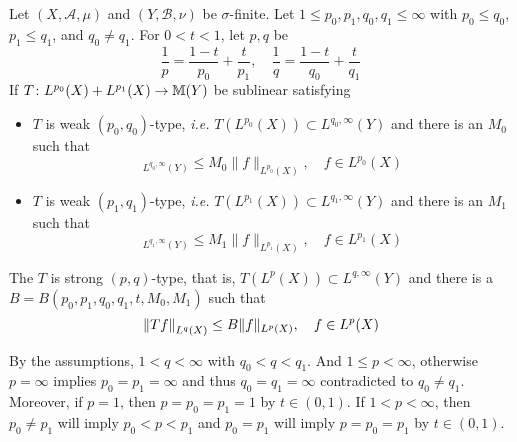 \begin{thm}
	Let $(X, \mathscr{A}, \mu)$ and $(Y, \mathscr{B}, \nu)$ be $\sigma$-finite. Let $1 \leq p_0,p_1,q_0,q_1 \leq \infty$ with $p_0 \leq q_0$, $p_1 \leq q_1$, and $q_0 \neq q_1$. For $0 < t < 1$, let $p,q$ be
	\begin{equation*}
		\frac{1}{p}=\frac{1-t}{p_0}+\frac{t}{p_1}, \quad \frac{1}{q}=\frac{1-t}{q_0}+\frac{t}{q_1}
	\end{equation*}
	If $T \colon L^{p_0}(X)+L^{p_1}(X) \rightarrow \mathbb{M}(Y)$ be sublinear satisfying
	\begin{itemize}
		\item $T$ is weak $(p_0,q_0)$-type, \emph{i.e.} $T(L^{p_0}(X)) \subset L^{q_0,\infty}(Y)$ and there is an $M_0$ such that
		\begin{equation*}
			[T f]_{L^{q_0, \infty}(Y)} \leq M_0\|f\|_{L^{p_0}(X)},\quad f \in L^{p_0}(X)
		\end{equation*}
		\item $T$ is weak $(p_1,q_1)$-type, \emph{i.e.} $T(L^{p_1}(X)) \subset L^{q_1,\infty}(Y)$ and there is an $M_1$ such that
		\begin{equation*}
			[T f]_{L^{q_1, \infty}(Y)} \leq M_1\|f\|_{L^{p_1}(X)},\quad f \in L^{p_1}(X)
		\end{equation*}
	\end{itemize}
	The $T$ is strong $(p,q)$-type, that is, $T(L^p(X)) \subset L^{q,\infty}(Y)$ and there is a $B = B(p_0,p_1,q_0,q_1,t,M_0,M_1)$ such that
	\begin{equation*}
		\left\lVert Tf\right\lVert_{L^q(X)} \leq B\|f\|_{L^p(X)},\quad f \in L^p(X)
	\end{equation*}
\end{thm}
\begin{rmk}
	By the assumptions, $1 < q < \infty$ with $q_0 < q < q_1$. And $1 \leq p < \infty$, otherwise $p = \infty$ implies $p_0 = p_1 = \infty$ and thus $q_0 = q_1 = \infty$ contradicted to $q_0 \neq q_1$. Moreover, if $p =1$, then $p = p_0 = p_1 = 1$ by $t \in (0,1)$. If $1 < p < \infty$, then $p_0 \neq p_1$ will imply $p_0 < p < p_1$ and $p_0 = p_1$ will imply $p = p_0 = p_1$ by $t \in (0,1)$.
\end{rmk}
